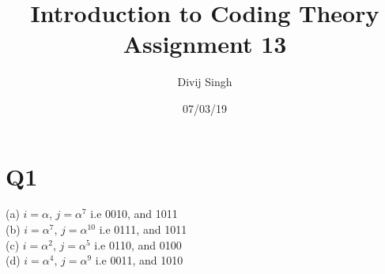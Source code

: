 \documentclass{article}
\title{Introduction to Coding Theory Assignment 13}
\author{Divij Singh}
\date{07/03/19}
\begin{document}
	\maketitle
	
	\section{Q1}
	(a) $i = \alpha$, $j = \alpha^7$ i.e 0010, and 1011\\
	(b) $i = \alpha^7$, $j = \alpha^{10}$ i.e 0111, and 1011\\
	(c) $i = \alpha^2$, $j = \alpha^5$ i.e 0110, and 0100\\
	(d) $i = \alpha^4$, $j = \alpha^{9}$ i.e 0011, and 1010 \\
\end{document}
